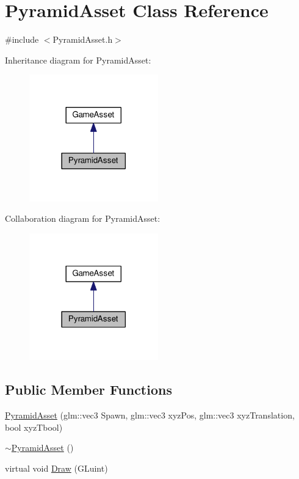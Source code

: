 \hypertarget{class_pyramid_asset}{}\section{Pyramid\+Asset Class Reference}
\label{class_pyramid_asset}


{\ttfamily \#include $<$Pyramid\+Asset.\+h$>$}



Inheritance diagram for Pyramid\+Asset\+:
\nopagebreak
\begin{figure}[H]
\begin{center}
\leavevmode
\includegraphics[width=158pt]{class_pyramid_asset__inherit__graph}
\end{center}
\end{figure}


Collaboration diagram for Pyramid\+Asset\+:
\nopagebreak
\begin{figure}[H]
\begin{center}
\leavevmode
\includegraphics[width=158pt]{class_pyramid_asset__coll__graph}
\end{center}
\end{figure}
\subsection*{Public Member Functions}
\begin{DoxyCompactItemize}
\item 
\hyperlink{class_pyramid_asset_a5588f0b34bf4c71dc0ffe86ed5111b04}{Pyramid\+Asset} (glm\+::vec3 Spawn, glm\+::vec3 xyz\+Pos, glm\+::vec3 xyz\+Translation, bool xyz\+Tbool)
\item 
\hyperlink{class_pyramid_asset_afb388a196f43a3808b2d4f6fdb89ee84}{$\sim$\+Pyramid\+Asset} ()
\item 
virtual void \hyperlink{class_pyramid_asset_aaea45da4956d79ec9ab96e9d0ccef3fe}{Draw} (G\+Luint)
\end{DoxyCompactItemize}


